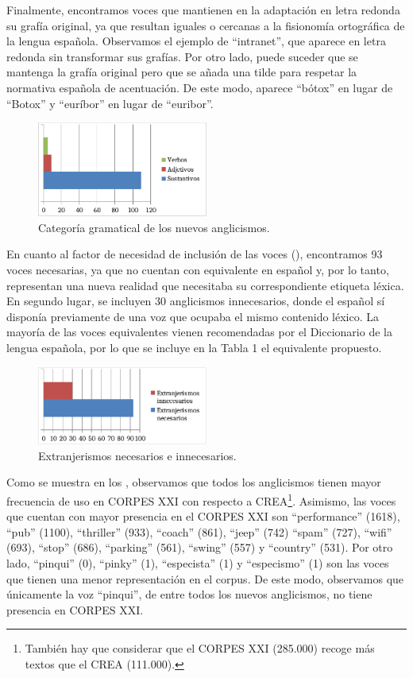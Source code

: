 \documentclass{textolivre}
\begin{document}
Finalmente, encontramos voces que mantienen en la adaptación en letra redonda su grafía original, ya que resultan iguales o cercanas a la fisionomía ortográfica de la lengua española. Observamos el ejemplo de “intranet”, que aparece en letra redonda sin transformar sus grafías. Por otro lado, puede suceder que se mantenga la grafía original pero que se añada una tilde para respetar la normativa española de acentuación. De este modo, aparece “bótox” en lugar de “Botox” y “euríbor” en lugar de “euribor”.

\begin{figure}[htbp]
 \centering
 \includegraphics[width=0.5\textwidth]{figure02.pdf}
 \caption{Categoría gramatical de los nuevos anglicismos.}
 \label{fig-02}
\end{figure}

En cuanto al factor de necesidad de inclusión de las voces (), encontramos 93 voces necesarias, ya que no cuentan con equivalente en español y, por lo tanto, representan una nueva realidad que necesitaba su correspondiente etiqueta léxica. En segundo lugar, se incluyen 30 anglicismos innecesarios, donde el español sí disponía previamente de una voz que ocupaba el mismo contenido léxico. La mayoría de las voces equivalentes vienen recomendadas por el Diccionario de la lengua española, por lo que se incluye en la Tabla 1 el equivalente propuesto. 

\begin{figure}[htbp]
 \centering
 \includegraphics[width=0.5\textwidth]{figure03.pdf}
 \caption{Extranjerismos necesarios e innecesarios.}
 \label{fig-03}
\end{figure}

Como se muestra en los , observamos que todos los anglicismos tienen mayor frecuencia de uso en CORPES XXI con respecto a CREA\footnote{
También hay que considerar que el CORPES XXI (285.000) recoge más textos que el CREA (111.000).
}. Asimismo, las voces que cuentan con mayor presencia en el CORPES XXI son “performance” (1618), “pub” (1100), “thriller” (933), “coach” (861), “jeep” (742) “spam” (727), “wifi” (693), “stop” (686), “parking” (561), “swing” (557) y “country” (531). Por otro lado, “pinqui” (0), “pinky” (1), “especista” (1) y “especismo” (1) son las voces que tienen una menor representación en el corpus. De este modo, observamos que únicamente la voz “pinqui”, de entre todos los nuevos anglicismos, no tiene presencia en CORPES XXI.
\end{document}
